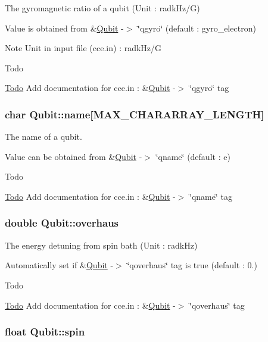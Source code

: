 The gyromagnetic ratio of a qubit (Unit \-: radk\-Hz/\-G) 

Value is obtained from \&\hyperlink{structQubit}{Qubit} -\/$>$ \char`\"{}qgyro\char`\"{} (default \-: gyro\-\_\-electron) \begin{DoxyNote}{Note}
Unit in input file (cce.\-in) \-: radk\-Hz/\-G 
\end{DoxyNote}
\begin{DoxyRefDesc}{Todo}
\item[\hyperlink{todo__todo000017}{Todo}]Add documentation for cce.\-in \-: \&\hyperlink{structQubit}{Qubit} -\/$>$ \char`\"{}qgyro\char`\"{} tag \end{DoxyRefDesc}
\hypertarget{structQubit_ab65a0dfa0efbd8a7862403f4704c1587}{
\subsubsection[{name}]{\setlength{\rightskip}{0pt plus 5cm}char Qubit\-::name\mbox{[}M\-A\-X\-\_\-\-C\-H\-A\-R\-A\-R\-R\-A\-Y\-\_\-\-L\-E\-N\-G\-T\-H\mbox{]}}}\label{structQubit_ab65a0dfa0efbd8a7862403f4704c1587}


The name of a qubit. 

Value can be obtained from \&\hyperlink{structQubit}{Qubit} -\/$>$ \char`\"{}qname\char`\"{} (default \-: e) \begin{DoxyRefDesc}{Todo}
\item[\hyperlink{todo__todo000015}{Todo}]Add documentation for cce.\-in \-: \&\hyperlink{structQubit}{Qubit} -\/$>$ \char`\"{}qname\char`\"{} tag \end{DoxyRefDesc}
\hypertarget{structQubit_aecb3943042094c4be043f375626dbd24}{
\subsubsection[{overhaus}]{\setlength{\rightskip}{0pt plus 5cm}double Qubit\-::overhaus}}\label{structQubit_aecb3943042094c4be043f375626dbd24}


The energy detuning from spin bath (Unit \-: radk\-Hz) 

Automatically set if \&\hyperlink{structQubit}{Qubit} -\/$>$ \char`\"{}qoverhaus\char`\"{} tag is true (default \-: 0.) \begin{DoxyRefDesc}{Todo}
\item[\hyperlink{todo__todo000020}{Todo}]Add documentation for cce.\-in \-: \&\hyperlink{structQubit}{Qubit} -\/$>$ \char`\"{}qoverhaus\char`\"{} tag \end{DoxyRefDesc}
\hypertarget{structQubit_a858930b7d9d9cafc70f26ab7993dadad}{
\subsubsection[{spin}]{\setlength{\rightskip}{0pt plus 5cm}float Qubit\-::spin}}\label{structQubit_a858930b7d9d9cafc70f26ab7993dadad}


